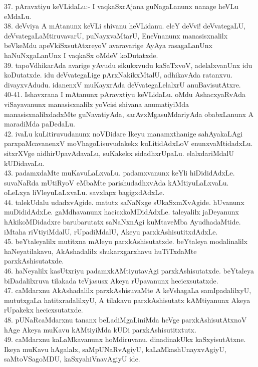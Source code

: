 \documentclass{article}
\begin{document}
37. pAravxtiyu keVLidaLu:- I vaqkaSxrAjana guNagaLanunx nanage heVLu eMdaLu.\\
38. deVviya A mAtanunx keVLi shivanu heVLidanu. eleY deVvi! deVvategaLU, deVvategaLaMtiruvavarU, puNayxvaMtarU, EneVnanunx manasisxnalilx beVkeMdu apeVkiSxsutAtxreyoV avaravarige AyAya rasagaLanUnx haNuNxgaLanUnx I vaqkaSx oMdeV koDutatxde.\\
39. tapoVdhikarAda avarige yAvudu sikukxvudu kaSaTxvoV, adelalxvanUnx idu koDutatxde. idu deVvategaLige pArxNakikxMtalU, adhikavAda ratanxvu. divayxvAdudu. idanenxV muKayxrAda deVvategaLelalxrU anuBavisutAtxre.\\
40-41. Ishavxrana I mAtanunx pAravxtiyu keVLidaLu. oMdu AshacxyaRvAda viSayavanunx manasisxnalilx yoVcisi shivana anumatiyiMda manasisxnalilxdadxMte guNavatiyAda, sarAvxMgasuMdariyAda obabxLanunx A maradiMda paDedaLu.\\
42. ivaLu kuLitiruvudanunx noVDidare Ikeyu manamxthanige sahAyakaLAgi parxpaMcavanenxV moVhagoLisuvudakekx kuLitidAdxLoV enunxvaMtidadxLu. sitxrXVge nidhirUpavAdavaLu, suKakekx sidadhxrUpaLu. elalxdariMdalU kUDidavaLu.\\
43. padamxdaMte muKavuLaLxvaLu. padamxvanunx keYli hiDididAdxLe. suvaNaRda mUtiRyoV eMbaMte parishudadhxvAda kAMtiyuLaLxvaLu. oLeLxya liVleyuLaLxvaLu. savxlapx bagigxdAdxLe.\\
44. talekUdalu udadxvAgide. matutx saNaNxge sUkaSxmXvAgide. hUvanunx muDididAdxLe. gaMdhavanunx hacicxkoMDidAdxLe. taleyalilx jaDeyanunx hAkikoMDidadxre barubarutatx saNaNxnAgi kuMtaveMba AyudhadaMtide. iMtaha riVtiyiMdalU, rUpadiMdalU, Akeyu parxkAshisutitxdAdxLe.\\
45. beYtaleyalilx mutitxna mAleyu parxkAshisutatxde. beYtaleya modalinalilx haNeyatilakavu, AkAshadalilx shukarxgarxhavu huTiTxdaMte parxkAshisutatxde.\\
46. haNeyalilx kasUtxriyu padamxkAMtiyutavAgi parxkAshisutatxde. beYtaleya biDadalilxruva tilakada teVjasusx Akeya rUpavanunx hecicxsutatxde.\\
47. caMdarxnu AkAshadalilx parxkAshisuvaMte A keVshagaLa samIpadalilxyU, mututxgaLa hatitxradalilxyU, A tilakavu parxkAshisutatx kAMtiyanunx Akeya rUpakekx hecicxsutatxde.\\
48. pUNaRcaMdarxnu tananx beLadiMgaLiniMda heVge parxkAshisutAtxnoV hAge Akeya muKavu kAMtiyiMda kUDi parxkAshisutitxtutx.\\
49. caMdarxnu kaLaMkavanunx hoMdiruvanu. dinadinakUkx kaSxyisutAtxne. Ikeya muKavu hAgalalx, saMpUNaRvAgiyU, kaLaMkashUnayxvAgiyU, saMtoVSagoMDU, kaSxyahiVnavAgiyU ide.\\
\end{document}
